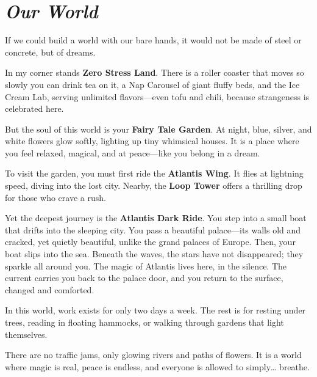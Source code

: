 \section*{\textit{Our World}}

If we could build a world with our bare hands, it would not be made of steel or concrete, but of dreams.

\vspace{0.5cm}

In my corner stands \textbf{Zero Stress Land}. There is a roller coaster that moves so slowly you can drink tea on it, a Nap Carousel of giant fluffy beds, and the Ice Cream Lab, serving unlimited flavors—even tofu and chili, because strangeness is celebrated here.

\vspace{0.5cm}

But the soul of this world is your \textbf{Fairy Tale Garden}. At night, blue, silver, and white flowers glow softly, lighting up tiny whimsical houses. It is a place where you feel relaxed, magical, and at peace—like you belong in a dream.

\vspace{0.5cm}

To visit the garden, you must first ride the \textbf{Atlantis Wing}. It flies at lightning speed, diving into the lost city. Nearby, the \textbf{Loop Tower} offers a thrilling drop for those who crave a rush.

\vspace{0.5cm}

Yet the deepest journey is the \textbf{Atlantis Dark Ride}. You step into a small boat that drifts into the sleeping city. You pass a beautiful palace—its walls old and cracked, yet quietly beautiful, unlike the grand palaces of Europe. Then, your boat slips into the sea. Beneath the waves, the stars have not disappeared; they sparkle all around you. The magic of Atlantis lives here, in the silence. The current carries you back to the palace door, and you return to the surface, changed and comforted.

\vspace{0.5cm}

In this world, work exists for only two days a week. The rest is for resting under trees, reading in floating hammocks, or walking through gardens that light themselves.

\vspace{0.5cm}

There are no traffic jams, only glowing rivers and paths of flowers. It is a world where magic is real, peace is endless, and everyone is allowed to simply… breathe.


